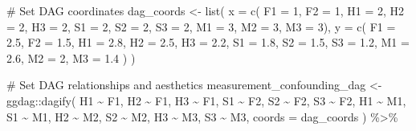 \documentclass[
  letterpaper,
  DIV=11,
  numbers=noendperiod]{scrreprt}
\newenvironment{Shaded}{\begin{snugshade}}{\end{snugshade}}
\newcommand{\AttributeTok}[1]{\textcolor[rgb]{0.40,0.45,0.13}{#1}}
\newcommand{\CommentTok}[1]{\textcolor[rgb]{0.37,0.37,0.37}{#1}}
\newcommand{\DecValTok}[1]{\textcolor[rgb]{0.68,0.00,0.00}{#1}}
\newcommand{\FloatTok}[1]{\textcolor[rgb]{0.68,0.00,0.00}{#1}}
\newcommand{\FunctionTok}[1]{\textcolor[rgb]{0.28,0.35,0.67}{#1}}
\newcommand{\NormalTok}[1]{\textcolor[rgb]{0.00,0.23,0.31}{#1}}
\newcommand{\OtherTok}[1]{\textcolor[rgb]{0.00,0.23,0.31}{#1}}
\newcommand{\SpecialCharTok}[1]{\textcolor[rgb]{0.37,0.37,0.37}{#1}}
\begin{document}
\begin{Shaded}
\begin{Highlighting}[]
\CommentTok{\# Set DAG coordinates}
\NormalTok{dag\_coords }\OtherTok{\textless{}{-}} \FunctionTok{list}\NormalTok{(}
  \AttributeTok{x =} \FunctionTok{c}\NormalTok{(}
    \AttributeTok{F1 =} \DecValTok{1}\NormalTok{, }
    \AttributeTok{F2 =} \DecValTok{1}\NormalTok{,}
    \AttributeTok{H1 =} \DecValTok{2}\NormalTok{,}
    \AttributeTok{H2 =} \DecValTok{2}\NormalTok{,}
    \AttributeTok{H3 =} \DecValTok{2}\NormalTok{,}
    \AttributeTok{S1 =} \DecValTok{2}\NormalTok{,}
    \AttributeTok{S2 =} \DecValTok{2}\NormalTok{,}
    \AttributeTok{S3 =} \DecValTok{2}\NormalTok{,}
    \AttributeTok{M1 =} \DecValTok{3}\NormalTok{,}
    \AttributeTok{M2 =} \DecValTok{3}\NormalTok{,}
    \AttributeTok{M3 =} \DecValTok{3}\NormalTok{),}
  \AttributeTok{y =} \FunctionTok{c}\NormalTok{(}
    \AttributeTok{F1 =} \FloatTok{2.5}\NormalTok{,}
    \AttributeTok{F2 =} \FloatTok{1.5}\NormalTok{,}
    \AttributeTok{H1 =} \FloatTok{2.8}\NormalTok{,}
    \AttributeTok{H2 =} \FloatTok{2.5}\NormalTok{,}
    \AttributeTok{H3 =} \FloatTok{2.2}\NormalTok{,}
    \AttributeTok{S1 =} \FloatTok{1.8}\NormalTok{,}
    \AttributeTok{S2 =} \FloatTok{1.5}\NormalTok{,}
    \AttributeTok{S3 =} \FloatTok{1.2}\NormalTok{,}
    \AttributeTok{M1 =} \FloatTok{2.6}\NormalTok{,}
    \AttributeTok{M2 =} \DecValTok{2}\NormalTok{,}
    \AttributeTok{M3 =} \FloatTok{1.4}
\NormalTok{  )}
\NormalTok{)}

\CommentTok{\# Set DAG relationships and aesthetics}
\NormalTok{measurement\_confounding\_dag }\OtherTok{\textless{}{-}}\NormalTok{ ggdag}\SpecialCharTok{::}\FunctionTok{dagify}\NormalTok{(}
\NormalTok{  H1 }\SpecialCharTok{\textasciitilde{}}\NormalTok{ F1,}
\NormalTok{  H2 }\SpecialCharTok{\textasciitilde{}}\NormalTok{ F1,}
\NormalTok{  H3 }\SpecialCharTok{\textasciitilde{}}\NormalTok{ F1,}
\NormalTok{  S1 }\SpecialCharTok{\textasciitilde{}}\NormalTok{ F2,}
\NormalTok{  S2 }\SpecialCharTok{\textasciitilde{}}\NormalTok{ F2,}
\NormalTok{  S3 }\SpecialCharTok{\textasciitilde{}}\NormalTok{ F2,}
\NormalTok{  H1 }\SpecialCharTok{\textasciitilde{}}\NormalTok{ M1,}
\NormalTok{  S1 }\SpecialCharTok{\textasciitilde{}}\NormalTok{ M1,}
\NormalTok{  H2 }\SpecialCharTok{\textasciitilde{}}\NormalTok{ M2,}
\NormalTok{  S2 }\SpecialCharTok{\textasciitilde{}}\NormalTok{ M2,}
\NormalTok{  H3 }\SpecialCharTok{\textasciitilde{}}\NormalTok{ M3,}
\NormalTok{  S3 }\SpecialCharTok{\textasciitilde{}}\NormalTok{ M3,}
  \AttributeTok{coords =}\NormalTok{ dag\_coords}
\NormalTok{) }\SpecialCharTok{\%\textgreater{}\%} 
  

\end{Highlighting}
\end{Shaded}
\end{document}
